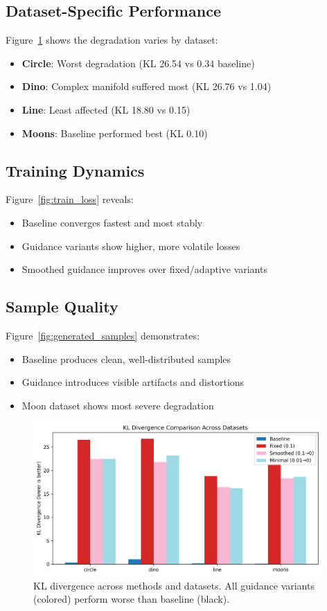 \documentclass{article} %
\begin{document}
\subsection{Dataset-Specific Performance}
Figure~\ref{fig:kl_comparison} shows the degradation varies by dataset:
\begin{itemize}
\item \textbf{Circle}: Worst degradation (KL 26.54 vs 0.34 baseline)
\item \textbf{Dino}: Complex manifold suffered most (KL 26.76 vs 1.04)
\item \textbf{Line}: Least affected (KL 18.80 vs 0.15)
\item \textbf{Moons}: Baseline performed best (KL 0.10)
\end{itemize}

\subsection{Training Dynamics}
Figure~\ref{fig:train_loss} reveals:
\begin{itemize}
\item Baseline converges fastest and most stably
\item Guidance variants show higher, more volatile losses
\item Smoothed guidance improves over fixed/adaptive variants
\end{itemize}

\subsection{Sample Quality}
Figure~\ref{fig:generated_samples} demonstrates:
\begin{itemize}
\item Baseline produces clean, well-distributed samples
\item Guidance introduces visible artifacts and distortions
\item Moon dataset shows most severe degradation
\end{itemize}

\begin{figure}[t]
\centering
\includegraphics[width=0.98\textwidth]{kl_comparison.png}
\caption{KL divergence across methods and datasets. All guidance variants (colored) perform worse than baseline (black).}
\label{fig:kl_comparison}
\end{figure}
\end{document}
